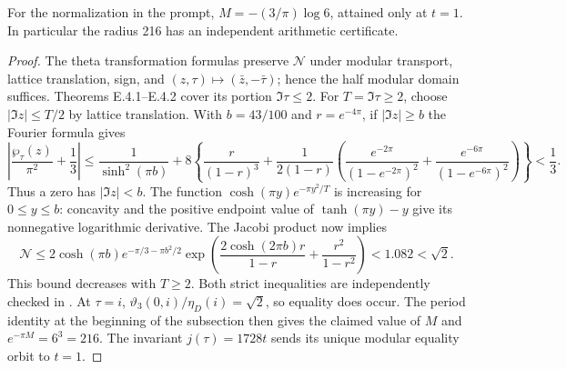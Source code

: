 \begin{corollary}\label{push:src:E.4.3}
For the normalization in the prompt, $M=-(3/\pi)\log6$, attained
only at $t=1$. In particular the radius 216 has an independent
arithmetic certificate.
\end{corollary}
\begin{proof}
The theta transformation formulas preserve $\mathcal N$ under modular
transport, lattice translation, sign, and
$(z,\tau)\mapsto(\bar z,-\bar\tau)$; hence the half modular domain
suffices. Theorems E.4.1--E.4.2 cover its portion $\Im\tau\leq2$.
For $T=\Im\tau\geq2$, choose $|\Im z|\leq T/2$ by lattice
translation. With $b=43/100$ and $r=e^{-4\pi}$, if
$|\Im z|\geq b$ the Fourier formula gives
\[
 \left|\frac{\wp_\tau(z)}{\pi^2}+\frac13\right|
 \leq\frac1{\sinh^2(\pi b)}+
 8\left\{\frac r{(1-r)^3}
 +\frac1{2(1-r)}\left(
 \frac{e^{-2\pi}}{(1-e^{-2\pi})^2}+
 \frac{e^{-6\pi}}{(1-e^{-6\pi})^2}\right)\right\}<\frac13.
\]
Thus a zero has $|\Im z|<b$. The function
$\cosh(\pi y)e^{-\pi y^2/T}$ is increasing for $0\leq y\leq b$:
concavity and the positive endpoint value of $\tanh(\pi y)-y$
give its nonnegative logarithmic derivative. The Jacobi product now
implies
\[
 \mathcal N\leq2\cosh(\pi b)
 e^{-\pi/3-\pi b^2/2}
 \exp\left(\frac{2\cosh(2\pi b)r}{1-r}
                +\frac{r^2}{1-r^2}\right)<1.082<\sqrt2.
\]
This bound decreases with $T\geq2$. Both strict inequalities are
independently checked in .
At $\tau=i$, $\vartheta_3(0,i)/\eta_D(i)=\sqrt2$, so equality
does occur. The period identity at the beginning of the subsection
then gives the claimed value of $M$ and
$e^{-\pi M}=6^3=216$. The invariant $j(\tau)=1728t$ sends its
unique modular equality orbit to $t=1$.
\end{proof}

